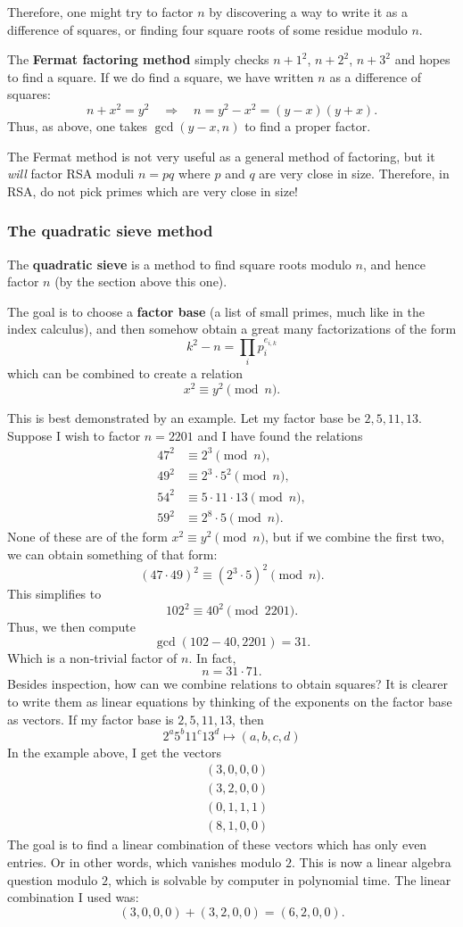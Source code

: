 \documentclass{article}
\theoremstyle{plain}
\theoremstyle{definition}
\theoremstyle{remark}
\numberwithin{theorem}{section}
\begin{document}
Therefore, one might try to factor $n$ by discovering a way to write it as a difference of squares, or finding four square roots of some residue modulo $n$.

The \textbf{Fermat factoring method} simply checks $n+1^2$, $n+2^2$, $n+3^2$ and hopes to find a square.  If we do find a square, we have written $n$ as a difference of squares:
\[
n + x^2 = y^2 \quad \Longrightarrow \quad n = y^2 - x^2 = (y-x)(y+x).
\]
Thus, as above, one takes $\gcd(y-x,n)$ to find a proper factor.

The Fermat method is not very useful as a general method of factoring, but it \emph{will} factor RSA moduli $n= pq$ where $p$ and $q$ are very close in size.  Therefore, in RSA, do not pick primes which are very close in size!


\subsubsection{The quadratic sieve method}

The \textbf{quadratic sieve} is a method to find square roots modulo $n$, and hence factor $n$ (by the section above this one).

The goal is to choose a \textbf{factor base} (a list of small primes, much like in the index calculus), and then somehow obtain a great many factorizations of the form
\[
 k^2 - n = \prod_{i} p_i^{e_{i,k}}
\]
which can be combined to create a relation
\[
x^2 \equiv y^2 \pmod{n}.
\]

This is best demonstrated by an example.  Let my factor base be $2,5,11,13$. Suppose I wish to factor $n=2201$ and I have found the relations
\begin{align*}
47^2 &\equiv 2^3 \pmod{n}, \\
49^2 &\equiv 2^3 \cdot 5^2 \pmod{n}, \\
54^2 &\equiv 5 \cdot 11 \cdot 13 \pmod{n}, \\
59^2 &\equiv 2^8 \cdot 5 \pmod{n}.
\end{align*}
None of these are of the form $x^2 \equiv y^2 \pmod{n}$, but if we combine the first two, we can obtain something of that form:
\[
(47 \cdot 49)^2 \equiv (2^3 \cdot 5)^2 \pmod{n}.
\]
This simplifies to
\[
102^2 \equiv 40^2 \pmod{2201}.
\]
Thus, we then compute
\[
\gcd(102-40,2201) = 31.
\]
Which is a non-trivial factor of $n$.  In fact,
\[
n = 31 \cdot 71.
\]
Besides inspection, how can we combine relations to obtain squares?  It is clearer to write them as linear equations by thinking of the exponents on the factor base as vectors.  If my factor base is $2,5,11,13$, then 
\[
2^a 5^b 11^c 13^d \mapsto (a,b,c,d)
\]
In the example above, I get the vectors
\begin{align*}
&(3,0,0,0) \\
&(3,2,0,0) \\
&(0,1,1,1) \\
&(8,1,0,0)    
\end{align*}
The goal is to find a linear combination of these vectors which has only even entries.  Or in other words, which vanishes modulo $2$.  This is now a linear algebra question modulo $2$, which is solvable by computer in polynomial time.  The linear combination I used was:
\[
(3,0,0,0) + (3,2,0,0) = (6,2,0,0).
\]
\end{document}
